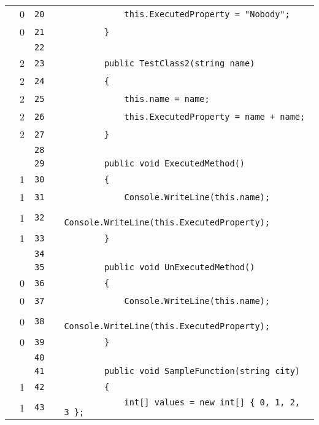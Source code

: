 \documentclass[a4paper,landscape,10pt]{article}
\begin{document}
\begin{longtable}[l]{lrrll}
\cellcolor{red} & 0 & \verb~20~ & & \verb~            this.ExecutedProperty = "Nobody";~\\
\cellcolor{red} & 0 & \verb~21~ & & \verb~        }~\\
\cellcolor{gray} &  & \verb~22~ & & \verb~~\\
\cellcolor{green} & 2 & \verb~23~ & & \verb~        public TestClass2(string name)~\\
\cellcolor{green} & 2 & \verb~24~ & & \verb~        {~\\
\cellcolor{green} & 2 & \verb~25~ & & \verb~            this.name = name;~\\
\cellcolor{green} & 2 & \verb~26~ & & \verb~            this.ExecutedProperty = name + name;~\\
\cellcolor{green} & 2 & \verb~27~ & & \verb~        }~\\
\cellcolor{gray} &  & \verb~28~ & & \verb~~\\
\cellcolor{gray} &  & \verb~29~ & & \verb~        public void ExecutedMethod()~\\
\cellcolor{green} & 1 & \verb~30~ & & \verb~        {~\\
\cellcolor{green} & 1 & \verb~31~ & & \verb~            Console.WriteLine(this.name);~\\
\cellcolor{green} & 1 & \verb~32~ & & \verb~            Console.WriteLine(this.ExecutedProperty);~\\
\cellcolor{green} & 1 & \verb~33~ & & \verb~        }~\\
\cellcolor{gray} &  & \verb~34~ & & \verb~~\\
\cellcolor{gray} &  & \verb~35~ & & \verb~        public void UnExecutedMethod()~\\
\cellcolor{red} & 0 & \verb~36~ & & \verb~        {~\\
\cellcolor{red} & 0 & \verb~37~ & & \verb~            Console.WriteLine(this.name);~\\
\cellcolor{red} & 0 & \verb~38~ & & \verb~            Console.WriteLine(this.ExecutedProperty);~\\
\cellcolor{red} & 0 & \verb~39~ & & \verb~        }~\\
\cellcolor{gray} &  & \verb~40~ & & \verb~~\\
\cellcolor{gray} &  & \verb~41~ & & \verb~        public void SampleFunction(string city)~\\
\cellcolor{green} & 1 & \verb~42~ & & \verb~        {~\\
\cellcolor{green} & 1 & \verb~43~ & & \verb~            int[] values = new int[] { 0, 1, 2, 3 };~\\

\end{longtable}
\end{document}
